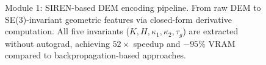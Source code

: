 \begin{figure}[ht]
\caption{Module 1: SIREN-based DEM encoding pipeline. From raw DEM to SE(3)-invariant geometric features via closed-form derivative computation. All five invariants ($K, H, \kappa_1, \kappa_2, \tau_g$) are extracted without autograd, achieving $52\times$ speedup and $-95\%$ VRAM compared to backpropagation-based approaches.}
\label{fig:siren-pipeline}
\end{figure}

